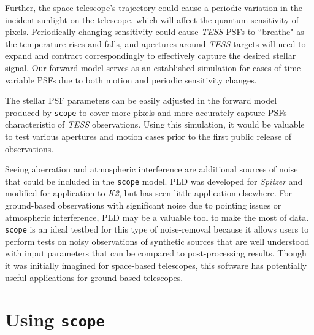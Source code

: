 \documentclass[12pt,preprint]{aastex}
\begin{document}
Further, the space telescope's trajectory could cause a periodic variation in the incident sunlight on the telescope, which will affect the quantum sensitivity of pixels. Periodically changing sensitivity could cause \textit{TESS} PSFs to ``breathe" as the temperature rises and falls, and apertures around \textit{TESS} targets will need to expand and contract correspondingly to effectively capture the desired stellar signal. Our forward model serves as an established simulation for cases of time-variable PSFs due to both motion and periodic sensitivity changes.

The stellar PSF parameters can be easily adjusted in the forward model produced by \texttt{scope} to cover more pixels and more accurately capture PSFs characteristic of \textit{TESS} observations. Using this simulation, it would be valuable to test various apertures and motion cases prior to the first public release of observations.

Seeing aberration and atmospheric interference are additional sources of noise that could be included in the \texttt{scope} model. PLD was developed for \textit{Spitzer} and modified for application to \textit{K2}, but has seen little application elsewhere. For ground-based observations with significant noise due to pointing issues or atmospheric interference, PLD may be a valuable tool to make the most of data. \texttt{scope} is an ideal testbed for this type of noise-removal because it allows users to perform tests on noisy observations of synthetic sources that are well understood with input parameters that can be compared to post-processing results. Though it was initially imagined for space-based telescopes, this software has potentially useful applications for ground-based telescopes.

\section{Using \texttt{scope}}
\end{document}
